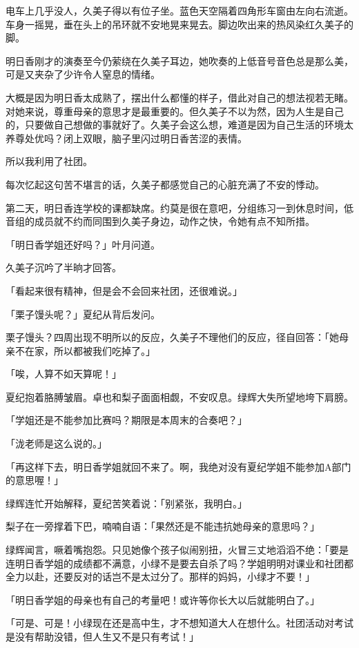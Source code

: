 \documentclass[UTF8]{ctexart}
\begin{document}
    电车上几乎没人，久美子得以有位子坐。蓝色天空隔着四角形车窗由左向右流逝。车身一摇晃，垂在头上的吊环就不安地晃来晃去。脚边吹出来的热风染红久美子的脚。 

    明日香刚才的演奏至今仍萦绕在久美子耳边，她吹奏的上低音号音色总是那么美，可是又夹杂了少许令人窒息的情绪。 

    大概是因为明日香太成熟了，摆出什么都懂的样子，借此对自己的想法视若无睹。对她来说，尊重母亲的意思才是最重要的。但久美子不以为然，因为人生是自己的，只要做自己想做的事就好了。久美子会这么想，难道是因为自己生活的环境太养尊处优吗？闭上双眼，脑子里闪过明日香苦涩的表情。 

    所以我利用了社团。 

    每次忆起这句苦不堪言的话，久美子都感觉自己的心脏充满了不安的悸动。 

    第二天，明日香连学校的课都缺席。约莫是很在意吧，分组练习一到休息时间，低音组的成员就不约而同围到久美子身边，动作之快，令她有点不知所措。 

    「明日香学姐还好吗？」叶月问道。 

    久美子沉吟了半晌才回答。 

    「看起来很有精神，但是会不会回来社团，还很难说。」 

    「栗子馒头呢？」夏纪从背后发问。 

    栗子馒头？四周出现不明所以的反应，久美子不理他们的反应，径自回答：「她母亲不在家，所以都被我们吃掉了。」 

    「唉，人算不如天算呢！」 

    夏纪抱着胳膊皱眉。卓也和梨子面面相觑，不安叹息。绿辉大失所望地垮下肩膀。 

    「学姐还是不能参加比赛吗？期限是本周末的合奏吧？」 

    「泷老师是这么说的。」 

    「再这样下去，明日香学姐就回不来了。啊，我绝对没有夏纪学姐不能参加A部门的意思喔！」 

    绿辉连忙开始解释，夏纪苦笑着说：「别紧张，我明白。」 

    梨子在一旁撑着下巴，喃喃自语：「果然还是不能违抗她母亲的意思吗？」 

    绿辉闻言，噘着嘴抱怨。只见她像个孩子似闹别扭，火冒三丈地滔滔不绝：「要是连明日香学姐的成绩都不满意，小绿不是要去自杀了吗？学姐明明对课业和社团都全力以赴，还要反对的话岂不是太过分了。那样的妈妈，小绿才不要！」 

    「明日香学姐的母亲也有自己的考量吧！或许等你长大以后就能明白了。」 

    「可是、可是！小绿现在还是高中生，才不想知道大人在想什么。社团活动对考试是没有帮助没错，但人生又不是只有考试！」 
\end{document}
